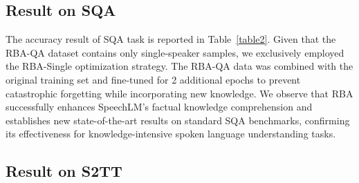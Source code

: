 \documentclass[letterpaper]{article} %
\begin{document}
\begin{table}[]
\centering
{}
\caption{BLEU results (En $\rightarrow$ X) on CoVoST-2.}
\label{table5}
\end{table}

\subsection{Result on SQA}
The accuracy result of SQA task is reported in Table~\ref{table2}. Given that the RBA-QA dataset contains only single-speaker samples, we exclusively employed the RBA-Single optimization strategy. The RBA-QA data was combined with the original training set and fine-tuned for 2 additional epochs to prevent catastrophic forgetting while incorporating new knowledge. We observe that RBA successfully enhances SpeechLM's factual knowledge comprehension and establishes new state-of-the-art results on standard SQA benchmarks, confirming its effectiveness for knowledge-intensive spoken language understanding tasks.




\subsection{Result on S2TT}
\end{document}
